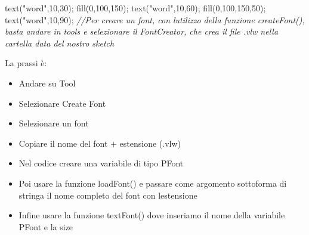 \documentclass[
]{article}
\newenvironment{Shaded}{}{}
\newcommand{\CommentTok}[1]{\textcolor[rgb]{0.38,0.63,0.69}{\textit{#1}}}
\newcommand{\DecValTok}[1]{\textcolor[rgb]{0.25,0.63,0.44}{#1}}
\newcommand{\FunctionTok}[1]{\textcolor[rgb]{0.02,0.16,0.49}{#1}}
\newcommand{\OperatorTok}[1]{\textcolor[rgb]{0.40,0.40,0.40}{#1}}
\newcommand{\StringTok}[1]{\textcolor[rgb]{0.25,0.44,0.63}{#1}}
\begin{document}
\begin{Shaded}
\begin{Highlighting}[]
\FunctionTok{text}\OperatorTok{(}\StringTok{"word"}\OperatorTok{,}\DecValTok{10}\OperatorTok{,}\DecValTok{30}\OperatorTok{);} 
\FunctionTok{fill}\OperatorTok{(}\DecValTok{0}\OperatorTok{,}\DecValTok{100}\OperatorTok{,}\DecValTok{150}\OperatorTok{);} 
\FunctionTok{text}\OperatorTok{(}\StringTok{"word"}\OperatorTok{,}\DecValTok{10}\OperatorTok{,}\DecValTok{60}\OperatorTok{);}
\FunctionTok{fill}\OperatorTok{(}\DecValTok{0}\OperatorTok{,}\DecValTok{100}\OperatorTok{,}\DecValTok{150}\OperatorTok{,}\DecValTok{50}\OperatorTok{);} 
\FunctionTok{text}\OperatorTok{(}\StringTok{"word"}\OperatorTok{,}\DecValTok{10}\OperatorTok{,}\DecValTok{90}\OperatorTok{);}
\CommentTok{//Per creare un font, con l\textquotesingle{}utilizzo della funzione createFont(), basta andare in tools e selezionare il FontCreator, che crea il file .vlw  nella cartella data del nostro sketch}
\end{Highlighting}
\end{Shaded}

La prassi è:

\begin{itemize}
\item
  Andare su \textquotesingle Tool\textquotesingle{}
\item
  Selezionare \textquotesingle Create Font\textquotesingle{}
\item
  Selezionare un font
\item
  Copiare il nome del font + estensione (.vlw)
\item
  Nel codice creare una variabile di tipo
  \textquotesingle PFont\textquotesingle{}
\item
  Poi usare la funzione \textquotesingle loadFont()\textquotesingle{} e
  passare come argomento sottoforma di stringa il nome completo del font
  con l\textquotesingle estensione
\item
  Infine usare la funzione
  \textquotesingle textFont()\textquotesingle\textquotesingle{} dove
  inseriamo il nome della variabile PFont e la size
\end{itemize}
\end{document}
